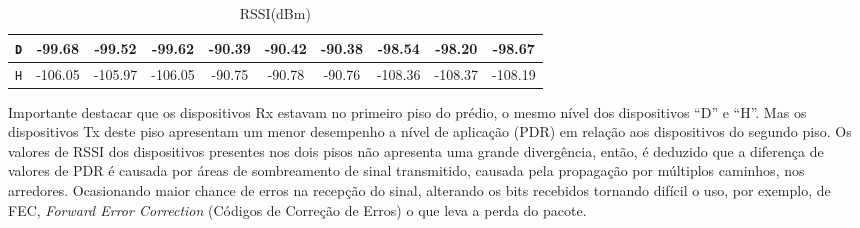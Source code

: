 \begin{table}[H]
\begin{subtable}{\textwidth}
\begin{center}
\begin{tabular}{|c|c|c|c|c|c|c|c|c|c|}
                        \texttt{D} & -99.68                                & -99.52                                  & -99.62                                 & -90.39         & -90.42         & -90.38         & -98.54         & -98.20         & -98.67         \\ \hline
                        \texttt{H} & -106.05                               & -105.97                                 & -106.05                                & -90.75         & -90.78         & -90.76         & -108.36        & -108.37        & -108.19        \\ \hline
                  \end{tabular}
                  \caption{RSSI(dBm)}
                  \label{table:rssi1}
            \end{center}
      \end{subtable}%
      \label{tab:table1}
\end{table}

Importante destacar que os dispositivos Rx estavam no primeiro piso do prédio, o mesmo nível dos dispositivos ``D'' e ``H''. Mas os dispositivos Tx deste piso apresentam um menor desempenho a nível de aplicação (PDR) em relação aos dispositivos do segundo piso. Os valores de RSSI dos dispositivos presentes nos dois pisos não apresenta uma grande divergência, então, é deduzido que a diferença de valores de PDR é causada por áreas de sombreamento de sinal transmitido, causada pela propagação por múltiplos caminhos, nos arredores. Ocasionando maior chance de erros na recepção do sinal, alterando os bits recebidos tornando difícil o uso, por exemplo, de FEC, \emph{Forward Error Correction} (Códigos de Correção de Erros) o que leva a perda do pacote.

